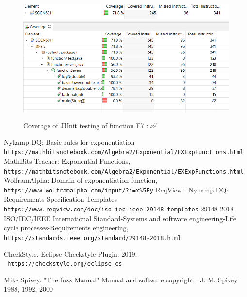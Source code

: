 \documentclass{article}
\begin{document}
\begin{figure}[htb]
\begin{center}
\includegraphics{coverage2}
\newline
\includegraphics{coverage3}
  \centering
  \caption{ Coverage of JUnit testing of function F7 : \(x^y\)
}
\end{center}
\end{figure}
\pagebreak
\newpage

\begin{thebibliography}{}


Nykamp DQ: Basic rules for exponentiation
\\\texttt{https://mathbitsnotebook.com/Algebra2/Exponential/EXExpFunctions.html}
MathBits Teacher: Exponential Functions,
\\\texttt{https://mathbitsnotebook.com/Algebra2/Exponential/EXExpFunctions.html}
WolframAlpha: Domain of exponentiation function,
\\\texttt{https://www.wolframalpha.com/input/?i=x\%5Ey}
ReqView : Nykamp DQ: Requirements Specification Templates
\\\texttt{https://www.reqview.com/doc/iso-iec-ieee-29148-templates}
29148-2018-ISO/IEC/IEEE International Standard-Systems and software engineering-Life cycle processes-Requirements engineering,
\\\texttt{https://standards.ieee.org/standard/29148-2018.html}

 CheckStyle. Eclipse Checkstyle Plugin. 2019.
\\\texttt{ https://checkstyle.org/eclipse-cs}

Mike Spivey. "The fuzz Manual" Manual and software copyright . J. M. Spivey 1988, 1992, 2000
\end{thebibliography}
\end{document}
